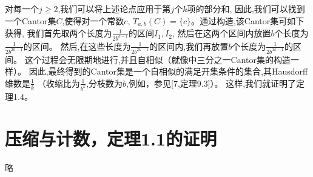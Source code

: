 对每一个$j\ge2$,我们可以将上述论点应用于第$j$个$k$项的部分和,
因此,我们可以找到一个Cantor集$C$,使得对一个常数$c$,
$T_{a,b}(C)=\{c\}$。通过构造,该Cantor集可如下获得,
我们首先取两个长度为$\frac{1}{2b^{k-1}}$的区间$I_1,I_2$,
然后在这两个区间内放置$b$个长度为$\frac{1}{2b^{2k-1}}$的区间。
然后,在这些长度为$\frac{1}{2b^{2k-1}}$的区间内,我们再放置$b$个长度为$\frac{1}{2b^{3k-1}}$的区间。
这个过程会无限期地进行,并且自相似（就像中三分之一Cantor集的构造一样）。
因此,最终得到的Cantor集是一个自相似的满足开集条件的集合,其Hausdorff维数是$\frac{1}{k}$
（收缩比为$\frac{1}{b^k}$,分枝数为$b$,例如，参见[7,定理9.3]）。
这样,我们就证明了定理1.4。
\section{压缩与计数，定理1.1的证明}
略
\nocite{*}
\begingroup
    \printbibliography[title={外文翻译参考文献}]
\endgroup

